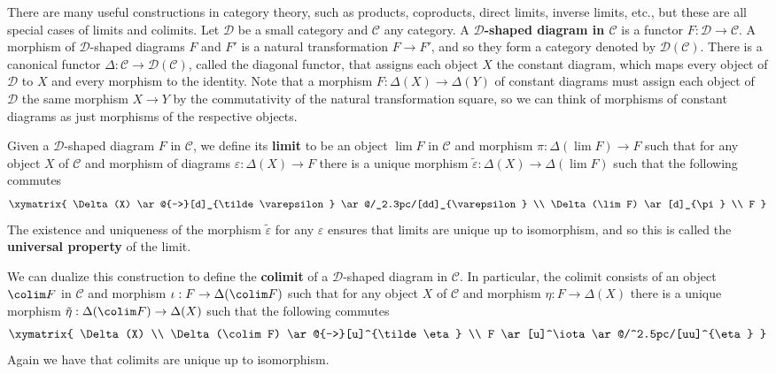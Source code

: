 There are many useful constructions in category theory, such as products, coproducts, direct limits, inverse limits, etc., but these are all special cases of limits and colimits. Let $\mathscr D$ be a small category and $\mathscr C$ any category. A \textbf{$\mathscr D$-shaped diagram in $\mathscr C$} is a functor $F : \mathscr D \rightarrow \mathscr C$. A morphism of $\mathscr D$-shaped diagrams $F$ and $F'$ is a natural transformation $F \rightarrow F'$, and so they form a category denoted by $\mathscr D(\mathscr C)$. There is a canonical functor $\Delta : \mathscr C \rightarrow \mathscr D(\mathscr C)$, called the diagonal functor, that assigns each object $X$ the constant diagram, which maps every object of $\mathscr D$ to $X$ and every morphism to the identity. Note that a morphism $F : \Delta(X) \rightarrow \Delta(Y)$ of constant diagrams must assign each object of $\mathscr D$ the same morphism $X \rightarrow Y$ by the commutativity of the natural transformation square, so we can think of morphisms of constant diagrams as just morphisms of the respective objects.

Given a $\mathscr D$-shaped diagram $F$ in $\mathscr C$, we define its \textbf{limit} to be an object $\lim F$ in $\mathscr C$ and morphism $\pi : \Delta(\lim F) \rightarrow F$ such that for any object $X$ of $\mathscr C$ and morphism of diagrams $\varepsilon : \Delta(X) \rightarrow F$ there is a unique morphism $\tilde\varepsilon : \Delta(X) \rightarrow \Delta(\lim F)$ such that the following commutes
\[
\xymatrix
{
	\Delta(X) \ar@{-->}[d]_{\tilde\varepsilon} \ar@/_2.3pc/[dd]_{\varepsilon} \\
	\Delta(\lim F) \ar[d]_{\pi} \\
	F
}
\]
The existence and uniqueness of the morphism $\tilde\varepsilon$ for any $\varepsilon$ ensures that limits are unique up to isomorphism, and so this is called the \textbf{universal property} of the limit.

We can dualize this construction to define the \textbf{colimit} of a $\mathscr D$-shaped diagram in $\mathscr C$. In particular, the colimit consists of an object $\colim F$ in $\mathscr C$ and morphism $\iota : F \rightarrow \Delta(\colim F)$ such that for any object $X$ of $\mathscr C$ and morphism $\eta : F \rightarrow \Delta(X)$ there is a unique morphism $\tilde\eta : \Delta(\colim F) \rightarrow \Delta(X)$ such that the following commutes
\[
\xymatrix
{
	\Delta(X) \\
	\Delta(\colim F) \ar@{-->}[u]^{\tilde\eta} \\
	F \ar[u]^\iota \ar@/^2.5pc/[uu]^{\eta}
}
\]
Again we have that colimits are unique up to isomorphism.

